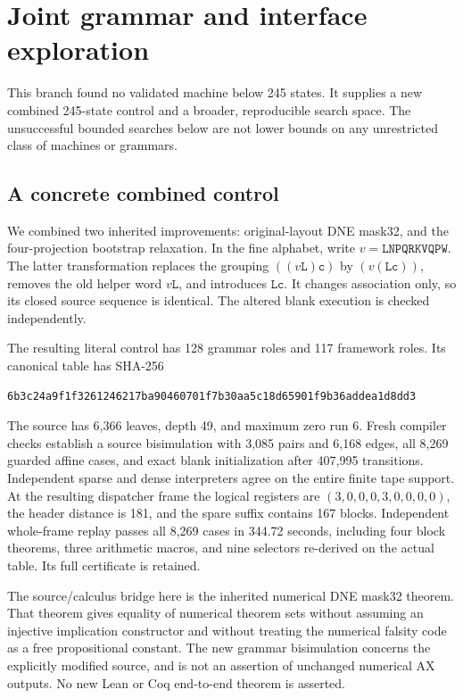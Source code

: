 \section{Joint grammar and interface exploration}
\label{sec:joint-grammar-exploration}

This branch found no validated machine below 245 states. It supplies a new
combined 245-state control and a broader, reproducible search space. The
unsuccessful bounded searches below are not lower bounds on any unrestricted
class of machines or grammars.

\subsection{A concrete combined control}

We combined two inherited improvements: original-layout DNE mask32, and the
four-projection bootstrap relaxation. In the fine alphabet, write
$v=\mathtt{LNPQRKVQPW}$. The latter transformation replaces the grouping
$((v\mathtt L)\mathtt c)$ by $(v(\mathtt L\mathtt c))$, removes the old helper
word $v\mathtt L$, and introduces $\mathtt{Lc}$. It changes association only,
so its closed source sequence is identical. The altered blank execution is
checked independently.

The resulting literal control has 128 grammar roles and 117 framework roles.
Its canonical table has SHA-256
\begin{verbatim}
6b3c24a9f1f3261246217ba90460701f7b30aa5c18d65901f9b36addea1d8dd3
\end{verbatim}
The source has 6,366 leaves, depth 49, and maximum zero run 6. Fresh compiler
checks establish a source bisimulation with 3,085 pairs and 6,168 edges,
all 8,269 guarded affine cases, and exact blank initialization after 407,995
transitions. Independent sparse and dense interpreters agree on the entire
finite tape support. At the resulting dispatcher frame the logical registers
are $(3,0,0,0,3,0,0,0,0)$, the header distance is 181, and the spare suffix
contains 167 blocks. Independent whole-frame replay passes all 8,269 cases in
344.72 seconds, including four block theorems, three arithmetic macros, and
nine selectors re-derived on the actual table. Its full certificate is retained.

The source/calculus bridge here is the inherited numerical DNE mask32 theorem.
That theorem gives equality of numerical theorem sets without assuming an
injective implication constructor and without treating the numerical falsity
code as a free propositional constant. The new grammar bisimulation concerns
the explicitly modified source, and is not an assertion of unchanged numerical
AX outputs. No new Lean or Coq end-to-end theorem is asserted.

